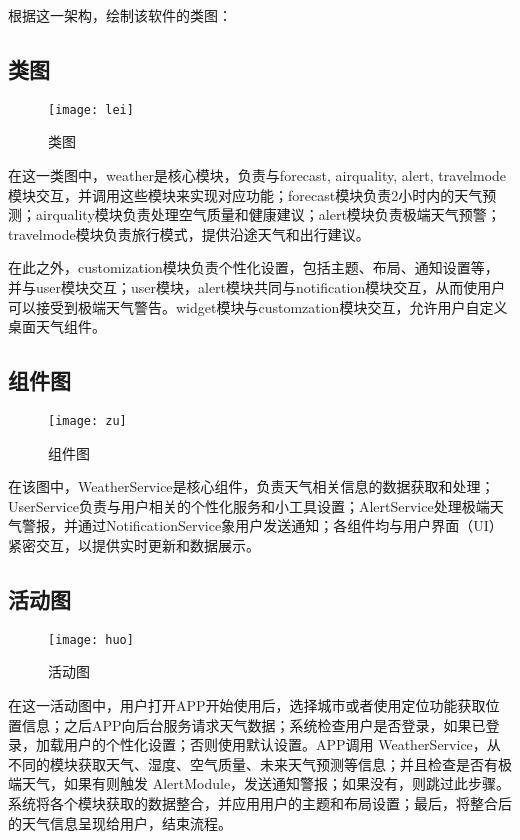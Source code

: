 \documentclass[UTF8]{ctexart}
\begin{document}
根据这一架构，绘制该软件的类图：

 \subsection{ 类图}

\begin{figure}[htbp]
\centering
\texttt{[image: lei]}
\caption{类图}
\label{figure}
\end{figure}

在这一类图中，weather是核心模块，负责与forecast, airquality, alert, travelmode模块交互，并调用这些模块来实现对应功能；forecast模块负责2小时内的天气预测；airquality模块负责处理空气质量和健康建议；alert模块负责极端天气预警；travelmode模块负责旅行模式，提供沿途天气和出行建议。

在此之外，customization模块负责个性化设置，包括主题、布局、通知设置等，并与user模块交互；user模块，alert模块共同与notification模块交互，从而使用户可以接受到极端天气警告。widget模块与customzation模块交互，允许用户自定义桌面天气组件。

\subsection{组件图}

\begin{figure}[htbp]
\centering
\texttt{[image: zu]}
\caption{组件图}
\label{figure}
\end{figure}

在该图中，WeatherService是核心组件，负责天气相关信息的数据获取和处理；UserService负责与用户相关的个性化服务和小工具设置；AlertService处理极端天气警报，并通过NotificationService象用户发送通知；各组件均与用户界面（UI）紧密交互，以提供实时更新和数据展示。

\subsection{活动图}

\begin{figure}[htbp]
\centering
\texttt{[image: huo]}
\caption{活动图}
\label{figure}
\end{figure}

在这一活动图中，用户打开APP开始使用后，选择城市或者使用定位功能获取位置信息；之后APP向后台服务请求天气数据；系统检查用户是否登录，如果已登录，加载用户的个性化设置；否则使用默认设置。APP调用 WeatherService，从不同的模块获取天气、湿度、空气质量、未来天气预测等信息；并且检查是否有极端天气，如果有则触发 AlertModule，发送通知警报；如果没有，则跳过此步骤。系统将各个模块获取的数据整合，并应用用户的主题和布局设置；最后，将整合后的天气信息呈现给用户，结束流程。
\end{document}
